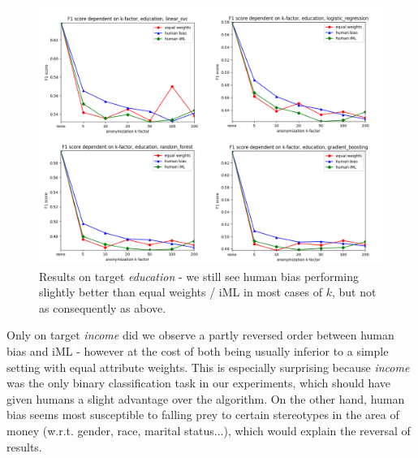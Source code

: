 \documentclass{llncs}
\begin{document}
\begin{figure}[!h]
	\begin{center}
		\hspace*{-0.8cm}
		\includegraphics[width=1.1\textwidth]{figures/education_num.png}
		\caption{Results on target \textit{education} - we still see human bias performing slightly better than equal weights / iML in most cases of $k$, but not as consequently as above.}
		\label{fig:results_education}
	\end{center}
\end{figure}


Only on target \textit{income} did we observe a partly reversed order between human bias and iML - however at the cost of both being usually inferior to a simple setting with equal attribute weights. This is especially surprising because \textit{income} was the only binary classification task in our experiments, which should have given humans a slight advantage over the algorithm. On the other hand, human bias seems most susceptible to falling prey to certain stereotypes in the area of money (w.r.t. gender, race, marital status...), which would explain the reversal of results.
\end{document}
